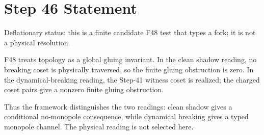 \documentclass[11pt]{article}
\begin{document}
\section*{Step 46 Statement}
Deflationary status: this is a finite candidate F48 test that types a fork; it is not a physical resolution.

F48 treats topology as a global gluing invariant. In the clean shadow reading, no breaking coset is physically traversed, so the finite gluing obstruction is zero. In the dynamical-breaking reading, the Step-41 witness coset is realized; the charged coset pairs give a nonzero finite gluing obstruction.

Thus the framework distinguishes the two readings: clean shadow gives a conditional no-monopole consequence, while dynamical breaking gives a typed monopole channel. The physical reading is not selected here.
\end{document}
